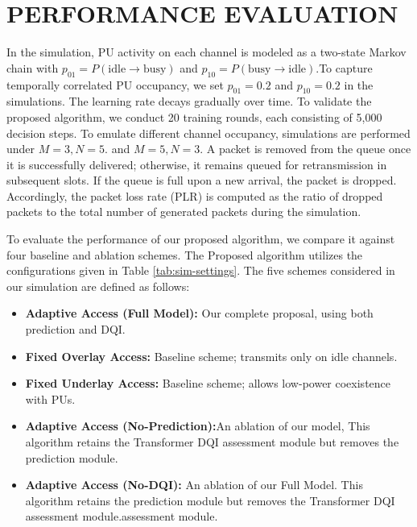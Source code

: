 \documentclass[journal]{IEEEtran}
\begin{document}
\section{PERFORMANCE EVALUATION}
In the simulation, PU activity on each channel is modeled as a two-state Markov chain with
$p_{01}=P (\text{idle}\rightarrow \text{busy})$ and $p_{10}=P (\text{busy}\rightarrow \text{idle})$.To capture temporally correlated PU occupancy, we set $p_{01}=0.2$ and $p_{10}=0.2$ in the simulations. The learning rate decays gradually over time. To validate the proposed algorithm, we conduct 20 training rounds, each consisting of 5,000 decision steps. To emulate different channel occupancy, simulations are performed under $M=3, N=5$. and $M=5, N=3$. A packet is removed from the queue once it is successfully delivered; otherwise, it remains queued for retransmission in subsequent slots. If the queue is full upon a new arrival, the packet is dropped. Accordingly, the packet loss rate (PLR) is computed as the ratio of dropped packets to the total number of generated packets during the simulation.\par 
To evaluate the performance of our proposed algorithm, we compare it against four baseline and ablation schemes. The Proposed algorithm utilizes the configurations given in Table \ref{tab:sim-settings}. The five schemes considered in our simulation are defined as follows:
\begin{itemize}
    \item \textbf{Adaptive Access (Full Model):} Our complete proposal, using both prediction and DQI.
    \item \textbf{Fixed Overlay Access:} Baseline scheme; transmits only on idle channels.
    \item \textbf{Fixed Underlay Access:} Baseline scheme; allows low-power coexistence with PUs.
    \item \textbf{Adaptive Access (No-Prediction):}An ablation of our model, This algorithm retains the Transformer DQI assessment module but removes the prediction module.
    \item \textbf{Adaptive Access (No-DQI):} An ablation of our Full Model. This algorithm retains the prediction module but removes the Transformer DQI assessment module.assessment module.
\end{itemize}
\par
\end{document}
